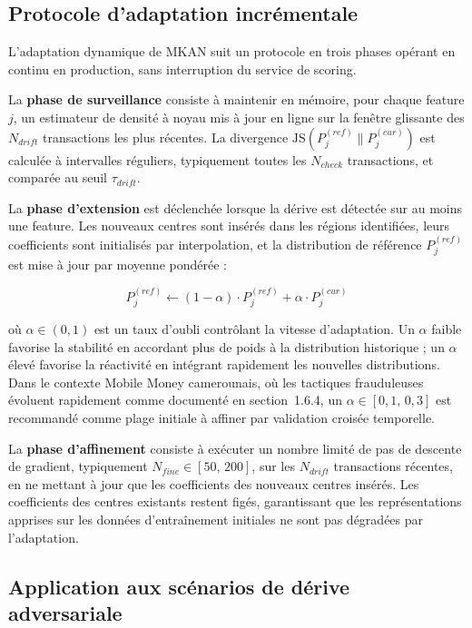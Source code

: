 \documentclass[11pt,a4paper,oneside]{report}
\theoremstyle{definition}
\theoremstyle{remark}
\begin{document}
\subsection{Protocole d'adaptation incrémentale}

L'adaptation dynamique de MKAN suit un protocole en trois phases opérant en continu en production, sans interruption du service de scoring.

La \textbf{phase de surveillance} consiste à maintenir en mémoire, pour chaque feature $j$, un estimateur de densité à noyau mis à jour en ligne sur la fenêtre glissante des $N_{drift}$ transactions les plus récentes. La divergence $\text{JS}(P_j^{(ref)} \| P_j^{(cur)})$ est calculée à intervalles réguliers, typiquement toutes les $N_{check}$ transactions, et comparée au seuil $\tau_{drift}$.

La \textbf{phase d'extension} est déclenchée lorsque la dérive est détectée sur au moins une feature. Les nouveaux centres sont insérés dans les régions identifiées, leurs coefficients sont initialisés par interpolation, et la distribution de référence $P_j^{(ref)}$ est mise à jour par moyenne pondérée :

\begin{equation}
    P_j^{(ref)} \leftarrow (1 - \alpha) \cdot P_j^{(ref)} + \alpha \cdot P_j^{(cur)}
\end{equation}

où $\alpha \in (0,1)$ est un taux d'oubli contrôlant la vitesse d'adaptation. Un $\alpha$ faible favorise la stabilité en accordant plus de poids à la distribution historique ; un $\alpha$ élevé favorise la réactivité en intégrant rapidement les nouvelles distributions. Dans le contexte Mobile Money camerounais, où les tactiques frauduleuses évoluent rapidement comme documenté en section~1.6.4, un $\alpha \in [0{,}1,\, 0{,}3]$ est recommandé comme plage initiale à affiner par validation croisée temporelle.

La \textbf{phase d'affinement} consiste à exécuter un nombre limité de pas de descente de gradient, typiquement $N_{fine} \in [50,\, 200]$, sur les $N_{drift}$ transactions récentes, en ne mettant à jour que les coefficients des nouveaux centres insérés. Les coefficients des centres existants restent figés, garantissant que les représentations apprises sur les données d'entraînement initiales ne sont pas dégradées par l'adaptation.

\subsection{Application aux scénarios de dérive adversariale}
\end{document}
